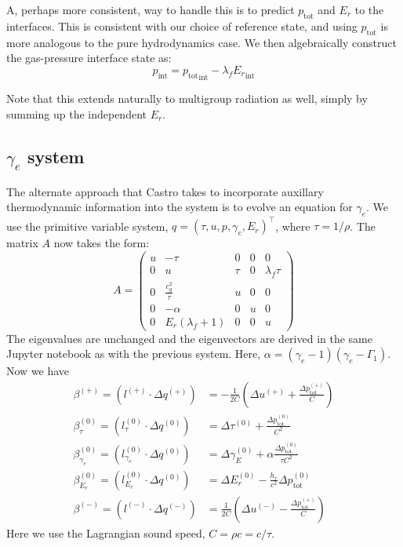 \documentclass[12pt]{article}
\newcommand{\evm}{{(-)}}
\newcommand{\evz}{{(0)}}
\newcommand{\evp}{{(+)}}
\begin{document}
A, perhaps more consistent, way to handle this is to predict $p_\mathrm{tot}$
and $E_r$ to the interfaces.  This is consistent with our choice of
reference state, and using $p_\mathrm{tot}$ is more analogous to the
pure hydrodynamics case.  We then algebraically construct the
gas-pressure interface state as:
\begin{equation}
p_\mathrm{int} = {p_\mathrm{tot}}_\mathrm{int} - \lambda_f {E_r}_\mathrm{int}
\end{equation}

Note that this extends naturally to multigroup radiation as well, simply by
summing up the independent $E_r$.

\subsection*{$\gamma_e$ system}

The alternate approach that Castro takes to incorporate auxillary
thermodynamic information into the system is to evolve an equation for
$\gamma_e$.  We use the primitive variable system, $q = (\tau, u, p,
\gamma_e, E_r)^\intercal$, where $\tau = 1/\rho$.  The matrix $A$ now
takes the form:
\begin{equation}
A = \left (
   \begin{matrix}
   u & - \tau & 0 & 0 & 0\\
   0 & u & \tau & 0 & \lambda_f \tau\\
   0 & \frac{c_{g}^{2}}{\tau} & u & 0 & 0\\
   0 & - \alpha & 0 & u & 0\\
   0 & E_{r} \left(\lambda_f + 1\right) & 0 & 0 & u
\end{matrix}\right)
\end{equation}
The eigenvalues are unchanged and the eigenvectors are derived in the
same Jupyter notebook as with the previous system.  
Here, $\alpha = (\gamma_e - 1)(\gamma_e - \Gamma_1)$.
Now we have
\begin{align}
\beta^\evp = ( l^\evp \cdot \Delta q^\evp ) &= -\frac{1}{2C}
   \left ( \Delta u^\evp + \frac{\Delta p_\mathrm{tot}^\evp}{C} \right ) \\
\beta^\evz_\tau = ( l^\evz_\tau \cdot \Delta q^\evz ) &= 
   \Delta \tau^\evz + \frac{\Delta p_\mathrm{tot}^\evz}{C^2} \\
\beta^\evz_{\gamma_e} = ( l^\evz_{\gamma_e} \cdot \Delta q^\evz ) &= 
   \Delta \gamma_E^\evz + \alpha \frac{\Delta p_\mathrm{tot}^\evz}{\tau C^2} \\
\beta^\evz_{E_r} = ( l^\evz_{E_r} \cdot \Delta q^\evz ) &= 
   \Delta E_r^\evz - \frac{h_r}{c^2} \Delta p_\mathrm{tot}^\evz \\
\beta^\evm = ( l^\evm \cdot \Delta q^\evm ) &= \frac{1}{2C} 
   \left ( \Delta u^\evm - \frac{\Delta p_\mathrm{tot}^\evp}{C} \right ) 
\end{align}
Here we use the Lagrangian sound speed, $C = \rho c = c/\tau$.
\end{document}
